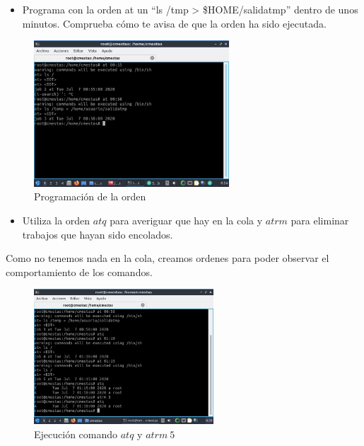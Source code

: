 \documentclass[12pt]{article}
\begin{document}
\begin{itemize}
    \item Programa con la orden at un “ls /tmp > \$HOME/salidatmp” dentro de
unos minutos. Comprueba cómo te avisa de que la orden ha sido
ejecutada.
\end{itemize}

\begin{figure}[h]
    \centering
    \includegraphics[width=0.65\textwidth]{images/screenB12.jpg}
    \caption{Programación de la orden}
\end{figure}

\clearpage
\newpage

\begin{itemize}
    \item Utiliza la orden $atq$ para averiguar que hay en la cola y $atrm$ para
eliminar trabajos que hayan sido encolados.
\end{itemize}

Como no tenemos nada en la cola, creamos ordenes para poder observar el comportamiento de los comandos.

\begin{figure}[h]
    \centering
    \includegraphics[width=0.6\textwidth]{images/screenB13.jpg}
    \caption{Ejecución comando $atq$ y $atrm~5$}
\end{figure}
\end{document}
